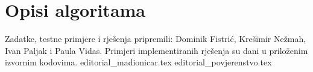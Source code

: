 \documentclass[a4paper]{article}
\date{May 29th 2022.}
\begin{document}
\section*{Opisi algoritama}
Zadatke, testne primjere i rješenja pripremili: Dominik Fistrić, Krešimir
Nežmah, Ivan Paljak i Paula Vidas.  Primjeri implementiranih rješenja su dani
u priloženim izvornim kodovima.
{editorial_madionicar.tex}
\clearpage
{editorial_povjerenstvo.tex}
\clearpage
\end{document}
